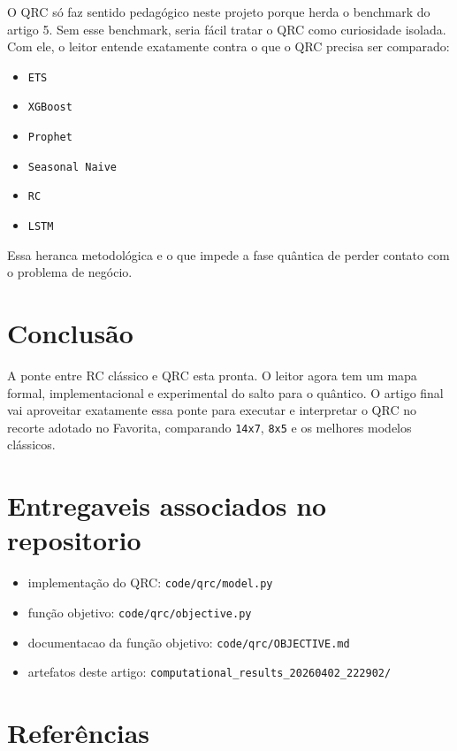 \documentclass[12pt]{article}
\providecommand{\tightlist}{%
              \setlength{\itemsep}{0pt}\setlength{\parskip}{0pt}}
\begin{document}
O QRC só faz sentido pedagógico neste projeto porque herda o benchmark do artigo 5. Sem esse benchmark, seria fácil tratar o QRC como curiosidade isolada. Com ele, o leitor entende exatamente contra o que o QRC precisa ser comparado:

\begin{itemize}
\tightlist
\item
  \texttt{ETS}
\item
  \texttt{XGBoost}
\item
  \texttt{Prophet}
\item
  \texttt{Seasonal\ Naive}
\item
  \texttt{RC}
\item
  \texttt{LSTM}
\end{itemize}

Essa heranca metodológica e o que impede a fase quântica de perder contato com o problema de negócio.

\section{Conclusão}\label{10-conclusuxe3o}

A ponte entre RC clássico e QRC esta pronta. O leitor agora tem um mapa formal, implementacional e experimental do salto para o quântico. O artigo final vai aproveitar exatamente essa ponte para executar e interpretar o QRC no recorte adotado no Favorita, comparando \texttt{14x7}, \texttt{8x5} e os melhores modelos clássicos.

\section*{Entregaveis associados no repositorio}\label{entregaveis-associados-no-repositorio}

\begin{itemize}
\tightlist
\item
  implementação do QRC: \texttt{code/qrc/model.py}
\item
  função objetivo: \texttt{code/qrc/objective.py}
\item
  documentacao da função objetivo: \texttt{code/qrc/OBJECTIVE.md}
\item
  artefatos deste artigo: \texttt{computational\_results\_20260402\_222902/}
\end{itemize}

\section{Referências}\label{referencias}
\end{document}
